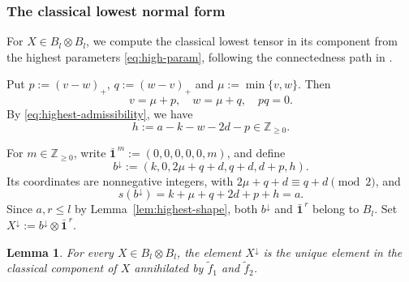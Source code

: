 \documentclass[11pt,reqno]{amsart}
\newcommand{\Zge}{\mathbb Z_{\ge 0}}
\numberwithin{table}{section}
\numberwithin{equation}{section}
\theoremstyle{plain}
\newtheorem{lemma}[theorem]{Lemma}
\theoremstyle{definition}
\begin{document}
\subsubsection{The classical lowest normal form}

For \(X\in B_l\otimes B_l\), we compute the classical lowest
tensor in its component from the highest parameters
\eqref{eq:high-param}, following the connectedness path in
\cite[Section~7.1]{KMOY}.

Put $p:=(v-w)_+$, $q:=(w-v)_+$ and $\mu:=\min\{v,w\}$.
Then
\begin{equation}\label{eq:vw-pqmu}
	v=\mu+p,
	\quad
	w=\mu+q,
	\quad
	pq=0.
\end{equation}
By \eqref{eq:highest-admissibility}, we have
\begin{equation}\label{eq:h-def}
	h:=a-k-w-2d-p\in\Zge.
\end{equation}

For \(m\in\Zge\), write
\(\bar{\mathbf1}^{\,m}:=(0,0,0,0,0,m)\), and define
\begin{equation}\label{eq:bdown-def}
	b^\downarrow
	:=
	(k,0,2\mu+q+d,q+d,d+p,h).
\end{equation}
Its coordinates are nonnegative integers, with
\(2\mu+q+d\equiv q+d\pmod2\), and
\begin{equation}\label{eq:s-bdown}
	s(b^\downarrow)
	=
	k+\mu+q+2d+p+h
	=
	a.
\end{equation}
Since \(a,r\le l\) by Lemma~\ref{lem:highest-shape},
both \(b^\downarrow\) and \(\bar{\mathbf1}^{\,r}\) belong to \(B_l\).
Set $X^\downarrow
:=
b^\downarrow\otimes\bar{\mathbf1}^{\,r}$.

\begin{lemma}
	\label{lem:classical-lowest-normal-form}
	For every \(X\in B_l\otimes B_l\), the element \(X^\downarrow\)
	is the unique element in the classical component of \(X\)
	annihilated by \(\widetilde f_1\) and \(\widetilde f_2\).
\end{lemma}
\end{document}

